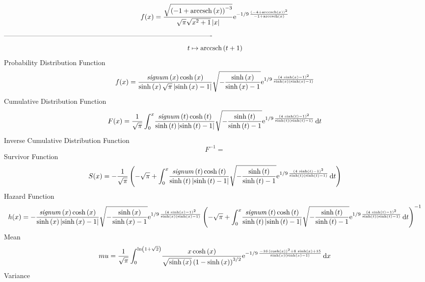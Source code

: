 \documentclass[12pt]{article}
\begin{document}
$$  f(x)={\frac {\sqrt { \left( -1+{\rm arccsch} \left(x\right) \right) ^{-3}}
}{\sqrt {\pi}\sqrt {{x}^{2}+1} \left| x \right| }{{\rm e}^{-1/9\,{
\frac { \left( -4+{\rm arccsch} \left(x\right) \right) ^{2}}{-1+
{\rm arccsch} \left(x\right)}}}}}
$$-------------------------------------------------------------------------------------------  \\$$t\mapsto {\rm arccsch} \left(t+1\right)
$$Probability Distribution Function 
$$  f(x)={\frac {{\it signum} \left( x \right) \cosh \left( x \right) }{\sinh
 \left( x \right) \sqrt {\pi} \left| \sinh \left( x \right) -1
 \right| }\sqrt {-{\frac {\sinh \left( x \right) }{\sinh \left( x
 \right) -1}}}{{\rm e}^{1/9\,{\frac { \left( 4\,\sinh \left( x
 \right) -1 \right) ^{2}}{\sinh \left( x \right)  \left( \sinh \left( 
x \right) -1 \right) }}}}}
$$Cumulative Distribution Function  
 $$F(x)={\frac {1}{\sqrt {\pi}}\int_{0}^{x}\!{\frac {{\it signum} \left( t
 \right) \cosh \left( t \right) }{\sinh \left( t \right)  \left| \sinh
 \left( t \right) -1 \right| }\sqrt {-{\frac {\sinh \left( t \right) 
}{\sinh \left( t \right) -1}}}{{\rm e}^{1/9\,{\frac { \left( 4\,\sinh
 \left( t \right) -1 \right) ^{2}}{\sinh \left( t \right)  \left( 
\sinh \left( t \right) -1 \right) }}}}}\,{\rm d}t}
$$ Inverse Cumulative Distribution Function 
  $$F^{-1} = $$Survivor Function 
 $$ S(x)=-{\frac {1}{\sqrt {\pi}} \left( -\sqrt {\pi}+\int_{0}^{x}\!{\frac {{
\it signum} \left( t \right) \cosh \left( t \right) }{\sinh \left( t
 \right)  \left| \sinh \left( t \right) -1 \right| }\sqrt {-{\frac {
\sinh \left( t \right) }{\sinh \left( t \right) -1}}}{{\rm e}^{1/9\,{
\frac { \left( 4\,\sinh \left( t \right) -1 \right) ^{2}}{\sinh
 \left( t \right)  \left( \sinh \left( t \right) -1 \right) }}}}}
\,{\rm d}t \right) }
$$ Hazard Function 
 $$ h(x)=-{\frac {{\it signum} \left( x \right) \cosh \left( x \right) }{\sinh
 \left( x \right)  \left| \sinh \left( x \right) -1 \right| }\sqrt {-{
\frac {\sinh \left( x \right) }{\sinh \left( x \right) -1}}}{{\rm e}^{
1/9\,{\frac { \left( 4\,\sinh \left( x \right) -1 \right) ^{2}}{\sinh
 \left( x \right)  \left( \sinh \left( x \right) -1 \right) }}}}
 \left( -\sqrt {\pi}+\int_{0}^{x}\!{\frac {{\it signum} \left( t
 \right) \cosh \left( t \right) }{\sinh \left( t \right)  \left| \sinh
 \left( t \right) -1 \right| }\sqrt {-{\frac {\sinh \left( t \right) 
}{\sinh \left( t \right) -1}}}{{\rm e}^{1/9\,{\frac { \left( 4\,\sinh
 \left( t \right) -1 \right) ^{2}}{\sinh \left( t \right)  \left( 
\sinh \left( t \right) -1 \right) }}}}}\,{\rm d}t \right) ^{-1}}
$$Mean 
 $$ mu={\frac {1}{\sqrt {\pi}}\int_{0}^{\ln  \left( 1+\sqrt {2} \right) }\!{
\frac {x\cosh \left( x \right) }{\sqrt {\sinh \left( x \right) }
 \left( 1-\sinh \left( x \right)  \right) ^{3/2}}{{\rm e}^{-1/9\,{
\frac {-16\, \left( \cosh \left( x \right)  \right) ^{2}+8\,\sinh
 \left( x \right) +15}{\sinh \left( x \right)  \left( \sinh \left( x
 \right) -1 \right) }}}}}\,{\rm d}x}
$$ Variance 
\end{document}
